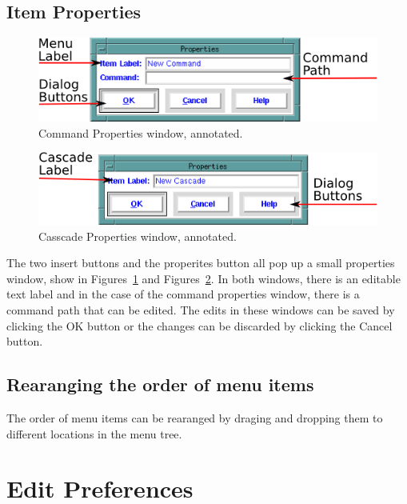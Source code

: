 \subsection{Item Properties}
\label{sect:ItemProperties}
\begin{figure}[hbpt] 
\begin{centering}
\includegraphics{CommandPropertiesAnnotated.png} 
\caption{Command Properties window, annotated.} 
\label{ref:fig:commandprop} 
\end{centering}
\end{figure}
\begin{figure}[hbpt] 
\begin{centering}
\includegraphics{CasscadePropertiesAnnotated.png} 
\caption{Casscade Properties window, annotated.} 
\label{ref:fig:cascadeprop} 
\end{centering}
\end{figure}
The two insert buttons and the properites button
all pop up a small properties window, show in
Figures~\ref{ref:fig:commandprop} and Figures~\ref{ref:fig:cascadeprop}.
In both windows, there is an editable text label and in the case of the
command properties window, there is a command path that can be edited.
The edits in these windows can be saved by clicking the OK button or the
changes can be discarded by clicking the Cancel button.

\subsection{Rearanging the order of menu items}

The order of menu items can be rearanged by draging and dropping them
to different locations in the menu tree.

\section{Edit Preferences}
\label{sect:EditPreferences}

